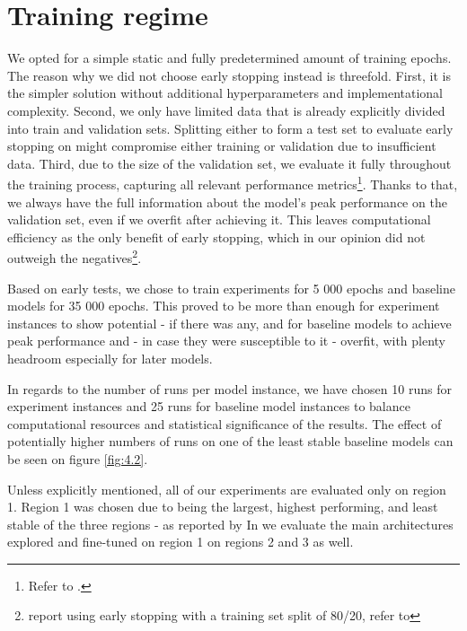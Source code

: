 \section{Training regime}\label{ch:4.4}

We opted for a simple static and fully predetermined amount of training epochs. The reason why we did not choose early stopping instead is threefold. First, it is the simpler solution without additional hyperparameters and implementational complexity. Second, we only have limited data that is already explicitly divided into train and validation sets. Splitting either to form a test set to evaluate early stopping on might compromise either training or validation due to insufficient data. Third, due to the size of the validation set, we evaluate it fully throughout the training process, capturing all relevant performance metrics\footnote{Refer to .}. Thanks to that, we always have the full information about the model’s peak performance on the validation set, even if we overfit after achieving it. This leaves computational efficiency as the only benefit of early stopping, which in our opinion did not outweigh the negatives\footnote{\cite{klindt} report using early stopping with a training set split of 80/20, refer to }.

Based on early tests, we chose to train experiments for 5 000 epochs and baseline models for 35 000 epochs. This proved to be more than enough for experiment instances to show potential - if there was any, and for baseline models to achieve peak performance and - in case they were susceptible to it - overfit, with plenty headroom especially for later models. 

In regards to the number of runs per model instance, we have chosen 10 runs for experiment instances and 25 runs for baseline model instances to balance computational resources and statistical significance of the results. The effect of potentially higher numbers of runs on one of the least stable baseline models can be seen on figure \ref{fig:4.2}.

Unless explicitly mentioned, all of our experiments are evaluated only on region 1. Region 1 was chosen due to being the largest, highest performing, and least stable of the three regions - as reported by \citeauthor{antolik} In  we evaluate the main architectures explored and fine-tuned on region 1 on regions 2 and 3 as well.

